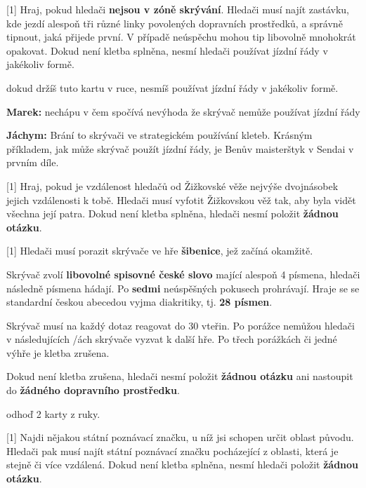 \begin{cards}
	 Hraj, pokud hledači \textbf{nejsou v zóně skrývání}. Hledači musí najít zastávku, kde jezdí alespoň tři různé linky povolených dopravních prostředků, a správně tipnout, jaká přijede první. V případě neúspěchu mohou tip libovolně mnohokrát opakovat. Dokud není kletba splněna, nesmí hledači používat jízdní řády v jakékoliv formě.

	\cost dokud držíš tuto kartu v ruce, nesmíš používat jízdní řády v jakékoliv formě.

	\begin{reasoning}
		\textbf{Marek:} nechápu v čem spočívá nevýhoda že skrývač nemůže používat jízdní řády

		\textbf{Jáchym:} Brání to skrývači ve strategickém používání kleteb. Krásným příkladem, jak může skrývač použít jízdní řády, je Benův maisterštyk v Sendai v prvním díle.
	\end{reasoning}

	 Hraj, pokud je vzdálenost hledačů od Žižkovské věže nejvýše dvojnásobek jejich vzdálenosti k tobě. Hledači musí vyfotit Žižkovskou věž tak, aby byla vidět všechna její patra. Dokud není kletba splněna, hledači nesmí položit \textbf{žádnou otázku}.

	 Hledači musí porazit skrývače ve hře \textbf{šibenice}, jež začíná okamžitě.

	Skrývač zvolí \textbf{libovolné spisovné české slovo} mající alespoň 4 písmena, hledači následně písmena hádají. Po \textbf{sedmi} neúspěšných pokusech prohrávají. Hraje se se standardní českou abecedou vyjma diakritiky, tj. \textbf{28 písmen}.

	Skrývač musí na každý dotaz reagovat do 30 vteřin. Po porážce nemůžou hledači v následujících \timecursehangmancooldown/ách skrývače vyzvat k další hře. Po třech porážkách či jedné výhře je kletba zrušena.

	Dokud není kletba zrušena, hledači nesmí položit \textbf{žádnou otázku} ani nastoupit do \textbf{žádného dopravního prostředku}.

	\cost odhoď 2 karty z ruky.

	 Najdi nějakou státní poznávací značku, u níž jsi schopen určit oblast původu. Hledači pak musí najít státní poznávací značku pocházející z oblasti, která je stejně či více vzdálená. Dokud není kletba splněna, nesmí hledači položit \textbf{žádnou otázku}.


\end{cards}
